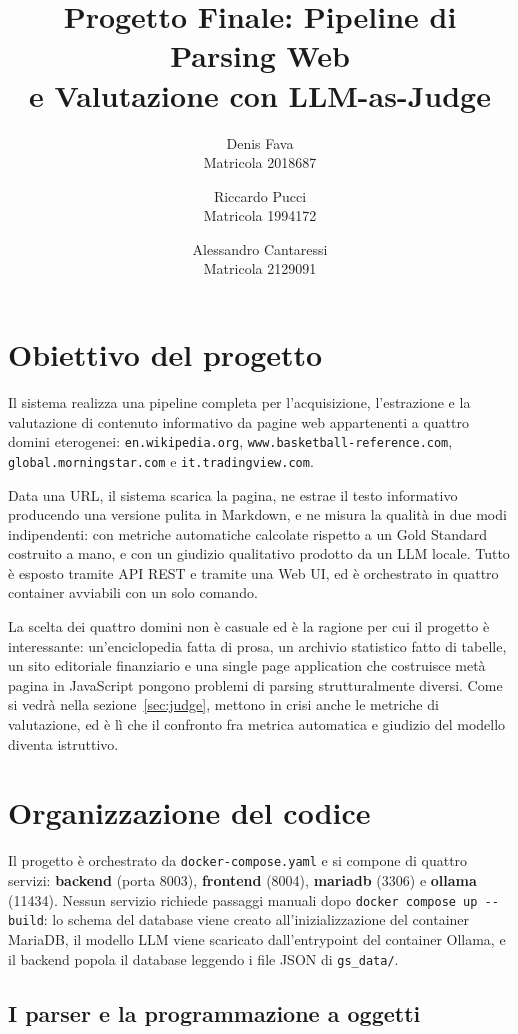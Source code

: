 \documentclass[10pt,a4paper,twocolumn]{article}
\title{\vspace{-1.2cm}\textbf{Progetto Finale: Pipeline di Parsing Web\\ e Valutazione con LLM-as-Judge}}
\author{
  Denis Fava \\ \small Matricola 2018687
  \and
  Riccardo Pucci \\ \small Matricola 1994172
  \and
  Alessandro Cantaressi \\ \small Matricola 2129091
}
\date{}
\begin{document}
\maketitle

\section{Obiettivo del progetto}

Il sistema realizza una pipeline completa per l'acquisizione, l'estrazione e
la valutazione di contenuto informativo da pagine web appartenenti a quattro
domini eterogenei: \texttt{en.wikipedia.org}, \texttt{www.basketball-reference.com},
\texttt{global.morningstar.com} e \texttt{it.tradingview.com}.

Data una URL, il sistema scarica la pagina, ne estrae il testo informativo
producendo una versione pulita in Markdown, e ne misura la qualità in due modi
indipendenti: con metriche automatiche calcolate rispetto a un Gold Standard
costruito a mano, e con un giudizio qualitativo prodotto da un LLM locale.
Tutto è esposto tramite API REST e tramite una Web UI, ed è orchestrato in
quattro container avviabili con un solo comando.

La scelta dei quattro domini non è casuale ed è la ragione per cui il progetto
è interessante: un'enciclopedia fatta di prosa, un archivio statistico fatto di
tabelle, un sito editoriale finanziario e una single page application che
costruisce metà pagina in JavaScript pongono problemi di parsing
strutturalmente diversi. Come si vedrà nella sezione~\ref{sec:judge}, mettono in
crisi anche le metriche di valutazione, ed è lì che il confronto fra metrica
automatica e giudizio del modello diventa istruttivo.

\section{Organizzazione del codice}

Il progetto è orchestrato da \texttt{docker-compose.yaml} e si compone di
quattro servizi: \textbf{backend} (porta 8003), \textbf{frontend} (8004),
\textbf{mariadb} (3306) e \textbf{ollama} (11434). Nessun servizio richiede
passaggi manuali dopo \texttt{docker compose up -{}-build}: lo schema del
database viene creato all'inizializzazione del container MariaDB, il modello
LLM viene scaricato dall'entrypoint del container Ollama, e il backend popola
il database leggendo i file JSON di \texttt{gs\_data/}.

\subsection*{I parser e la programmazione a oggetti}
\end{document}
